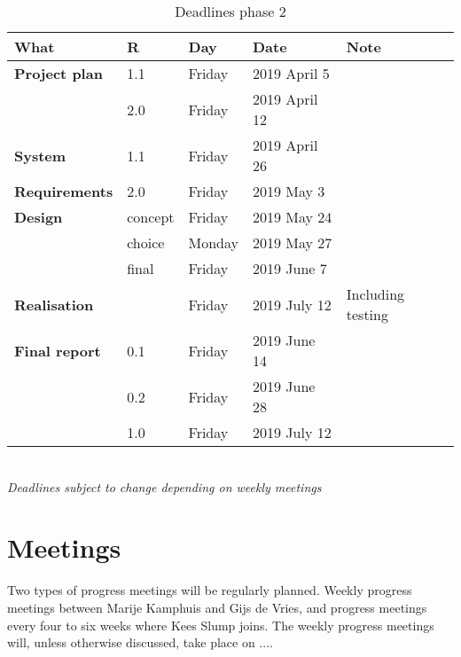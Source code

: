 \begin{table}[h!]
	\begin{tabular}{l|llll}
		\textbf{What} 		&	R	& 	Day	&	Date	&	Note \\
		\hline
		\textbf{Project plan}& 1.1	& Friday 		& 2019 April 5	&	 \\
		\rowcolor{Gray}
		 	&	2.0 	&	 Friday & 2019 April 12 & \\
		 	\hline
		\textbf{System} & 1.1 & Friday & 2019 April 26 & \\
		\rowcolor{Gray}
		\textbf{Requirements}& 2.0 & Friday & 2019 May 3 & \\
		\hline
		\textbf{Design} & concept & Friday & 2019 May 24 & \\
		\rowcolor{Gray}
		 & choice & Monday & 2019 May 27 &  \\
		 & final  & Friday & 2019 June 7 & \\
		 \rowcolor{Gray}
		 \hline
		 \textbf{Realisation} & & Friday & 2019 July 12 & Including testing\\
		 \hline
		 \textbf{Final report} & 0.1 & Friday & 2019 June 14 & \\
		 \rowcolor{Gray}
		 & 0.2 & Friday & 2019 June 28 & \\
		 & 1.0 & Friday & 2019 July 12 & \\
		 \hline
	\end{tabular} \\
	\textit{Deadlines subject to change depending on weekly meetings}
	\caption{Deadlines phase 2}
	\label{tab:deadlines2}
\end{table}

\section{Meetings}
Two types of progress meetings will be regularly planned. Weekly progress meetings between Marije Kamphuis and Gijs de Vries, and progress meetings every four to six weeks where Kees Slump joins. The weekly progress meetings will, unless otherwise discussed, take place on ....

